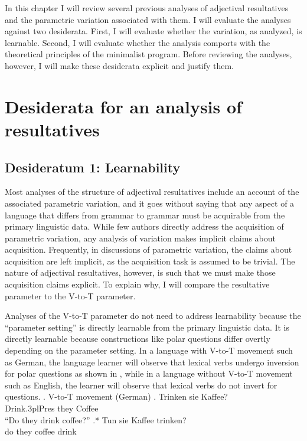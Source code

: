 \documentclass[MilwayThesis]{subfiles}
\begin{document}
In this chapter I will review several previous analyses of adjectival resultatives and the parametric variation associated with them.
I will evaluate the analyses against two desiderata.
First, I will evaluate whether the variation, as analyzed, is learnable.
Second, I will evaluate whether the analysis comports with the theoretical principles of the minimalist program.
Before reviewing the analyses, however, I will make these desiderata explicit and justify them.

\section{Desiderata for an analysis of resultatives}

\subsection{Desideratum 1: Learnability}
Most analyses of the structure of adjectival resultatives include an account of the associated parametric variation, and it goes without saying that any aspect of a language that differs from grammar to grammar must be acquirable from the primary linguistic data.
While few authors directly address the acquisition of parametric variation, any analysis of variation makes implicit claims about acquisition.
Frequently, in discussions of parametric variation, the claims about acquisition are left implicit, as the acquisition task is assumed to be trivial.
The nature of adjectival resultatives, however, is such that we must make those acquisition claims explicit.
To explain why, I will compare the resultative parameter to the V-to-T parameter.

Analyses of the V-to-T parameter do not need to address learnability because the ``parameter setting'' is directly learnable from the primary linguistic data.
It is directly learnable because constructions like polar questions differ overtly depending on the parameter setting.
In a language with V-to-T movement such as German, the language learner will observe that lexical verbs undergo inversion for polar questions as shown in \Next, while in a language without V-to-T movement such as English, the learner will observe that lexical verbs do not invert for questions.
\ex. V-to-T movement (German)
\ag. Trinken sie Kaffee?\\
Drink.3plPres they Coffee\\
``Do they drink coffee?''
\bg.* Tun sie Kaffee trinken?\\
do they coffee drink\\
\end{document}
